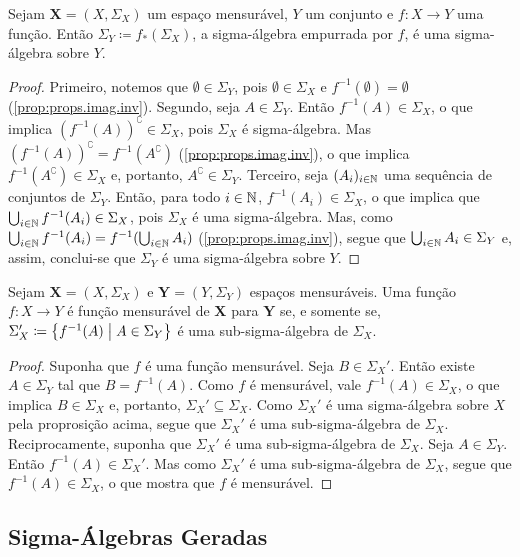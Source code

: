 \begin{prop}
Sejam $\bm X = (X,\Sigma_X)$ um espaço mensurável, $Y$ um conjunto e $f: X \to Y$ uma função. Então $\Sigma_Y \coloneqq f_*(\Sigma_X)$, a sigma-álgebra empurrada por $f$, é uma sigma-álgebra sobre $Y$.
\end{prop}
\begin{proof}
Primeiro, notemos que $\emptyset \in \Sigma_Y$, pois $\emptyset \in \Sigma_X$ e $f^{-1}(\emptyset) = \emptyset$ (\ref{prop:props.imag.inv}). Segundo, seja $A \in \Sigma_Y$. Então $f^{-1}(A) \in \Sigma_ X$, o que implica $(f^{-1}(A))^\complement \in \Sigma_ X$, pois $\Sigma_ X$ é sigma-álgebra. Mas $(f^{-1}(A))^\complement = f^{-1}(A^\complement)$ (\ref{prop:props.imag.inv}), o que implica $f^{-1}(A^\complement) \in \Sigma_ X$ e, portanto, $A^\complement \in \Sigma_ Y$. Terceiro, seja $(A_i)_{i \in \mathbb{N}}$ uma sequência de conjuntos de $\Sigma_ Y$. Então, para todo $i \in \mathbb{N}$, $f^{-1}(A_i) \in \Sigma_ X$, o que implica que $\bigcup_{i \in \mathbb{N}} f^{-1}(A_i) \in \Sigma_ X$, pois $\Sigma_ X$ é uma sigma-álgebra. Mas, como $\bigcup_{i \in \mathbb{N}} f^{-1}(A_i) = f^{-1}(\bigcup_{i \in \mathbb{N}} A_i)$ (\ref{prop:props.imag.inv}), segue que $\bigcup_{i \in \mathbb{N}} A_i \in \Sigma_ Y$ e, assim, conclui-se que $\Sigma_ Y$ é uma sigma-álgebra sobre $Y$.
\end{proof}

\begin{prop}
	Sejam $\bm X = (X,\Sigma_ X)$ e $\bm Y = (Y,\Sigma_ Y)$ espaços mensuráveis. Uma função $f: X \to Y$ é função mensurável de $\bm X$ para $\bm Y$ se, e somente se, $\Sigma_ X' \coloneqq \set{f^{-1}(A)}{A \in \Sigma_ Y}$ é uma sub-sigma-álgebra de $\Sigma_ X$.
\end{prop}
\begin{proof}
	Suponha que $f$ é uma função mensurável. Seja $B \in \Sigma_ X'$. Então existe $A \in \Sigma_ Y$ tal que $B = f^{-1}(A)$. Como $f$ é mensurável, vale $f^{-1}(A) \in \Sigma_ X$, o que implica $B \in \Sigma_ X$ e, portanto, $\Sigma_ X' \subseteq \Sigma_ X$. Como $\Sigma_ X'$ é uma sigma-álgebra sobre $X$ pela proprosição acima, segue que $\Sigma_ X'$ é uma sub-sigma-álgebra de $\Sigma_ X$. Reciprocamente, suponha que $\Sigma_ X'$ é uma sub-sigma-álgebra de $\Sigma_ X$. Seja $A \in \Sigma_ Y$. Então $f^{-1}(A) \in \Sigma_ X'$. Mas como $\Sigma_ X'$ é uma sub-sigma-álgebra de $\Sigma_ X$, segue que $f^{-1}(A) \in \Sigma_ X$, o que mostra que $f$ é mensurável. 
\end{proof}

\subsection{Sigma-Álgebras Geradas}


